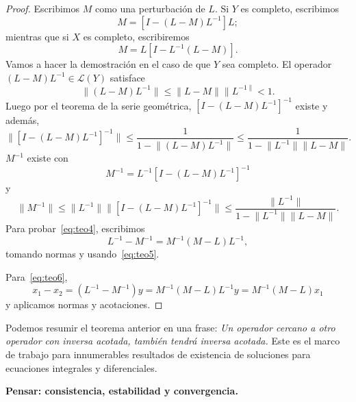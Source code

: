 \begin{proof}
	Escribimos $M$ como una perturbación de $L$. Si $Y$ es completo, escribimos
	\begin{equation}
		M = [I - (L - M)L^{-1}]L;
	\end{equation}
	mientras que si $X$ es completo, escribiremos
	\begin{equation}
		M = L[I - L^{-1}(L - M)].
	\end{equation}
	Vamos a hacer la demostración en el caso de que $Y$ sea completo.
	El operador $(L-M)L^{-1} \in \mathcal{L}(Y)$ satisface
	\begin{equation}
		\lVert (L - M)L^{-1} \rVert \leqslant \lVert L - M \rVert \lVert L^{-1 \rVert} < 1.
	\end{equation}
	Luego por el teorema de la serie geométrica, $[I-(L-M)L^{-1}]^{-1}$ existe y además,
	\begin{equation}
		\lVert [I-(L-M)L^{-1}]^{-1} \rVert \leqslant \dfrac{1}{1 - \lVert (L-M)L^{-1}\rVert} \leqslant \dfrac{1}{1 - \lVert L^{-1} \rVert \lVert L-M \rVert }.
	\end{equation}
	$M^{-1}$ existe con
	\begin{equation}
		M^{-1} = L^{-1}[I-(L-M)L^{-1}]^{-1}
	\end{equation}
	y
	\begin{equation}
		\lVert M^{-1} \rVert \leqslant \lVert L^{-1} \rVert \lVert [I-(L-M)L^{-1}]^{-1} \rVert \leqslant \dfrac{\lVert L^{-1} \rVert}{1 - \lVert L^{-1} \rVert \lVert L-M \rVert}.
	\end{equation}
	Para probar~\eqref{eq:teo4}, escribimos
	\begin{equation}
		L^{-1} - M^{-1} = M^{-1}(M-L)L^{-1},
	\end{equation}
	tomando normas y usando~\eqref{eq:teo5}.
	
	Para~\eqref{eq:teo6},
	\begin{equation}
		x_1 - x_2 = (L^{-1} - M^{-1})y = M^{-1}(M-L)L^{-1}y = M^{-1}(M-L)x_1
	\end{equation}
	y aplicamos normas y acotaciones.
\end{proof}
Podemos resumir el teorema anterior en una frase: \textit{Un operador cercano a otro operador con inversa acotada, también tendrá inversa acotada.} Este es el marco de trabajo para innumerables resultados de existencia de soluciones para ecuaciones integrales y diferenciales.

\textbf{Pensar: consistencia, estabilidad y convergencia.}

